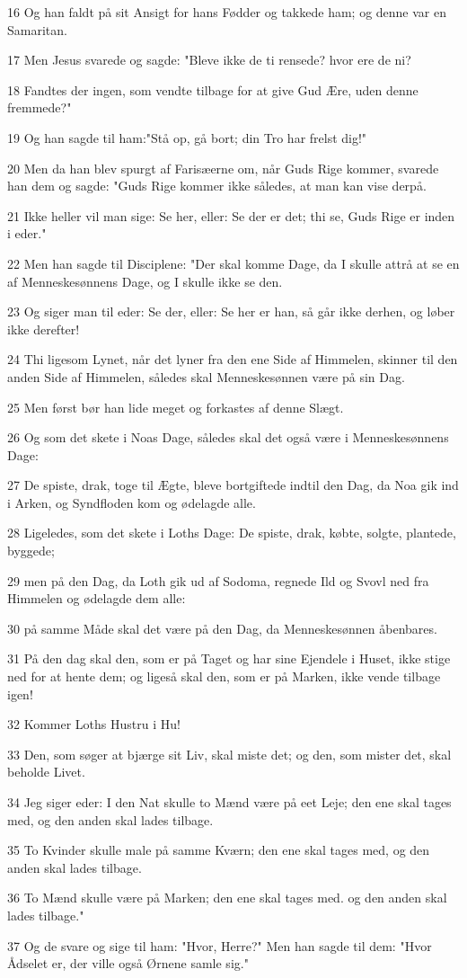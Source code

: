 \par 16 Og han faldt på sit Ansigt for hans Fødder og takkede ham; og denne var en Samaritan.
\par 17 Men Jesus svarede og sagde: "Bleve ikke de ti rensede? hvor ere de ni?
\par 18 Fandtes der ingen, som vendte tilbage for at give Gud Ære, uden denne fremmede?"
\par 19 Og han sagde til ham:"Stå op, gå bort; din Tro har frelst dig!"
\par 20 Men da han blev spurgt af Farisæerne om, når Guds Rige kommer, svarede han dem og sagde: "Guds Rige kommer ikke således, at man kan vise derpå.
\par 21 Ikke heller vil man sige: Se her, eller: Se der er det; thi se, Guds Rige er inden i eder."
\par 22 Men han sagde til Disciplene: "Der skal komme Dage, da I skulle attrå at se en af Menneskesønnens Dage, og I skulle ikke se den.
\par 23 Og siger man til eder: Se der, eller: Se her er han, så går ikke derhen, og løber ikke derefter!
\par 24 Thi ligesom Lynet, når det lyner fra den ene Side af Himmelen, skinner til den anden Side af Himmelen, således skal Menneskesønnen være på sin Dag.
\par 25 Men først bør han lide meget og forkastes af denne Slægt.
\par 26 Og som det skete i Noas Dage, således skal det også være i Menneskesønnens Dage:
\par 27 De spiste, drak, toge til Ægte, bleve bortgiftede indtil den Dag, da Noa gik ind i Arken, og Syndfloden kom og ødelagde alle.
\par 28 Ligeledes, som det skete i Loths Dage: De spiste, drak, købte, solgte, plantede, byggede;
\par 29 men på den Dag, da Loth gik ud af Sodoma, regnede Ild og Svovl ned fra Himmelen og ødelagde dem alle:
\par 30 på samme Måde skal det være på den Dag, da Menneskesønnen åbenbares.
\par 31 På den dag skal den, som er på Taget og har sine Ejendele i Huset, ikke stige ned for at hente dem; og ligeså skal den, som er på Marken, ikke vende tilbage igen!
\par 32 Kommer Loths Hustru i Hu!
\par 33 Den, som søger at bjærge sit Liv, skal miste det; og den, som mister det, skal beholde Livet.
\par 34 Jeg siger eder: I den Nat skulle to Mænd være på eet Leje; den ene skal tages med, og den anden skal lades tilbage.
\par 35 To Kvinder skulle male på samme Kværn; den ene skal tages med, og den anden skal lades tilbage.
\par 36 To Mænd skulle være på Marken; den ene skal tages med. og den anden skal lades tilbage."
\par 37 Og de svare og sige til ham: "Hvor, Herre?" Men han sagde til dem: "Hvor Ådselet er, der ville også Ørnene samle sig."

